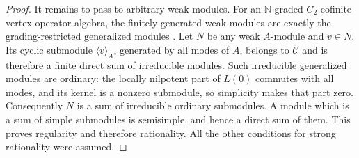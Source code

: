 \documentclass[11pt,reqno]{amsart}
\theoremstyle{definition}\newtheorem{definition}[theorem]{Definition}
\theoremstyle{remark}\newtheorem{remark}[theorem]{Remark}
\numberwithin{equation}{section}
\begin{document}
\begin{proof}
It remains to pass to arbitrary weak modules. For an $\mathbb N$-graded $C_2$-cofinite vertex operator algebra, the finitely generated weak modules are exactly the grading-restricted generalized modules \cite[Proposition 2.11]{McRae}. Let $N$ be any weak $A$-module and $v\in N$. Its cyclic submodule $\langle v\rangle_A$, generated by all modes of $A$, belongs to $\mathcal C$ and is therefore a finite direct sum of irreducible modules. Such irreducible generalized modules are ordinary: the locally nilpotent part of $L(0)$ commutes with all modes, and its kernel is a nonzero submodule, so simplicity makes that part zero. Consequently $N$ is a sum of irreducible ordinary submodules. A module which is a sum of simple submodules is semisimple, and hence a direct sum of them. This proves regularity and therefore rationality. All the other conditions for strong rationality were assumed.
\end{proof}
\end{document}
